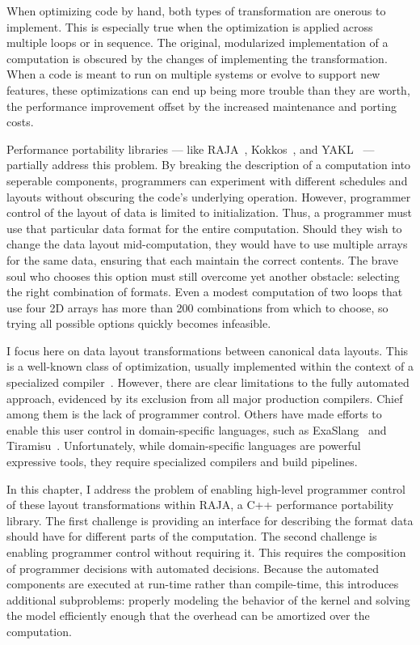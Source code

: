 When optimizing code by hand, both types of transformation are onerous to implement. 
This is especially true when the optimization is applied across multiple loops or in sequence.
The original, modularized implementation of a computation is obscured by the changes of implementing the transformation. 
When a code is meant to run on multiple systems or evolve to support new features, these optimizations can end up being more trouble than they are worth, the performance improvement offset by the increased maintenance and porting costs.

Performance portability libraries --- like RAJA~\cite{hornung2014RAJA}, Kokkos~\cite{edwards2014kokkos}, and YAKL~\cite{norman2022portable} --- partially address this problem.
By breaking the description of a computation into seperable components, programmers can experiment with different schedules and layouts without obscuring the code's underlying operation.
However, programmer control of the layout of data is limited to initialization. 
Thus, a programmer must use that particular data format for the entire computation.
Should they wish to change the data layout mid-computation, they would have to use multiple arrays for the same data, ensuring that each maintain the correct contents.
The brave soul who chooses this option must still overcome yet another obstacle: selecting the right combination of formats.
Even a modest computation of two loops that use four 2D arrays has more than 200 combinations from which to choose, so trying all possible options quickly becomes infeasible. 

I focus here on data layout transformations between canonical data layouts.
This is a well-known class of optimization, usually implemented within the context of a specialized compiler~\cite{bixby1994automatic,kennedy1995automatic,kennedy1998automatic,chen2004ilp,chen2005constraint,chen2005integrating, ozturk2011data}.
However, there are clear limitations to the fully automated approach, evidenced by its exclusion from all major production compilers.
Chief among them is the lack of programmer control.
Others have made efforts to enable this user control in domain-specific languages, such as ExaSlang~\cite{kronawitter2018automatic} and Tiramisu~\cite{baghdadi2019tiramisu}.
Unfortunately, while domain-specific languages are powerful expressive tools, they require specialized compilers and build pipelines. 

In this chapter, I address the problem of enabling high-level programmer control of these layout transformations within RAJA, a C++ performance portability library.
The first challenge is providing an interface for describing the format data should have for different parts of the computation.
The second challenge is enabling programmer control without requiring it.
This requires the composition of programmer decisions with automated decisions.
Because the automated components are executed at run-time rather than compile-time, this introduces additional subproblems: properly modeling the behavior of the kernel and solving the model efficiently enough that the overhead can be amortized over the computation.

